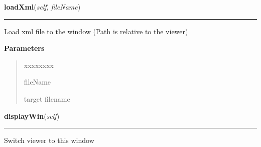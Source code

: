     \label{tracetool:WinTrace:loadXml}

    \vspace{0.5ex}

\hspace{.8\funcindent}\begin{boxedminipage}{\funcwidth}

    \raggedright \textbf{loadXml}(\textit{self}, \textit{fileName})

    \vspace{-1.5ex}

    \rule{\textwidth}{0.5\fboxrule}
\setlength{\parskip}{2ex}
    Load xml file to the window (Path is relative to the viewer)

\setlength{\parskip}{1ex}
      \textbf{Parameters}
      \vspace{-1ex}

      \begin{quote}
        \begin{Ventry}{xxxxxxxx}

          \item[fileName]

          target filename

        \end{Ventry}

      \end{quote}

    \end{boxedminipage}

    \label{tracetool:WinTrace:displayWin}

    \vspace{0.5ex}

\hspace{.8\funcindent}\begin{boxedminipage}{\funcwidth}

    \raggedright \textbf{displayWin}(\textit{self})

    \vspace{-1.5ex}

    \rule{\textwidth}{0.5\fboxrule}
\setlength{\parskip}{2ex}
    Switch viewer to this window

\setlength{\parskip}{1ex}
    \end{boxedminipage}

